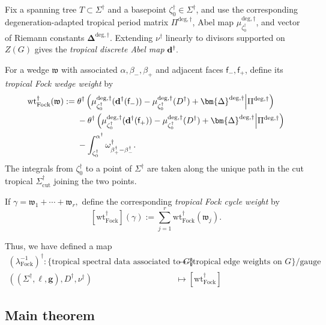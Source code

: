 \documentclass[12pt]{amsart}
\numberwithin{equation}{section}
\theoremstyle{definition}
\def\Gtor{G}
\newcommand{\wt}{\mathrm{wt}}
\def\divisor{D}
\def\trop{\dagger}
\def\bface{\mathsf{f}}
\def\dam{{\bf d}}
\def\zzG{{{Z}(G)}}
\def\divisor{D}
\def\vecRC{\bm{\Delta}}
\def\ptSig{\zeta}
\def\baseptT{{\ptSig_0^\trop}}
\def\mcurve{\Sigma}
\def\tropmcurve{\mcurve^\trop}
\begin{document}
Fix a spanning tree $T\subset\tropmcurve$ and a basepoint
$\baseptT\in\tropmcurve$, and use the corresponding
degeneration-adapted tropical period matrix
$\Pi^{\mathrm{deg},\trop}$, Abel map
$\mu_{\baseptT}^{\mathrm{deg},\trop}$, and vector of Riemann constants
$\vecRC^{\mathrm{deg},\trop}$. Extending $\nu^\trop$ linearly to divisors supported on $\zzG$ gives
the \emph{tropical discrete Abel map}
$
\dam^\trop.
$

For a wedge $\mathfrak w$ with associated
$\alpha,\beta_-,\beta_+$ and adjacent faces
$\bface_-,\bface_+$, define its \emph{tropical Fock wedge weight} by
\begin{equation}
\label{eq:tropical_fock_weight}
\begin{aligned}
\wt_{\mathrm{Fock}}^\trop(\mathfrak w)
:={}&
\theta^\trop\left(
\mu_{\baseptT}^{\mathrm{deg},\trop}
    (\dam^\trop(\bface_-))
-\mu_{\baseptT}^{\mathrm{deg},\trop}
    (\divisor^\trop)
+\vecRC^{\mathrm{deg},\trop}
\middle|
\Pi^{\mathrm{deg},\trop}
\right)
\\
&-
\theta^\trop\left(
\mu_{\baseptT}^{\mathrm{deg},\trop}
    (\dam^\trop(\bface_+))
-\mu_{\baseptT}^{\mathrm{deg},\trop}
    (\divisor^\trop)
+\vecRC^{\mathrm{deg},\trop}
\middle|
\Pi^{\mathrm{deg},\trop}
\right)
\\
&-
\int_{\baseptT}^{\alpha^\trop}
\omega_{\beta_+^\trop-\beta_-^\trop}^\trop.
\end{aligned}
\end{equation}
The integrals from $\baseptT$ to a point
of $\tropmcurve$ are taken along the unique path in the cut tropical $\tropmcurve_{\mathrm{cut}}$ joining the two
points.

If
$
\gamma
=
\mathfrak w_1+\cdots+\mathfrak w_r,
$
define the corresponding \emph{tropical Fock cycle weight} by
\begin{equation}
\label{eq:tropical_face_weight}
[\wt_{\mathrm{Fock}}^\trop](\gamma)
:=
\sum_{j=1}^r
\wt_{\mathrm{Fock}}^\trop(\mathfrak w_j).
\end{equation}

Thus, we have defined a map
\begin{align*}
 (\lambda^{-1}_{\mathrm{Fock}})^\trop:  \{\text{tropical spectral data associated to $\Gtor$}\}& \to \{\text{tropical edge weights on $\Gtor$}\}/\text{gauge}\\
((\tropmcurve,\ell,\bm g),\divisor^\trop,\nu^\trop)&\mapsto[\wt_{\mathrm{Fock}}^\trop]
\end{align*}


\subsection{Main theorem}
\end{document}
